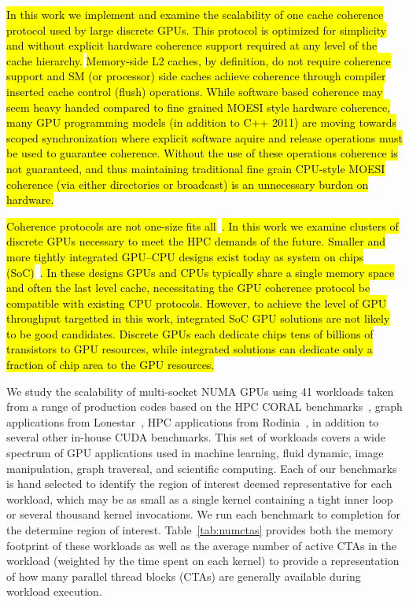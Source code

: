 \hl{In this work we implement and examine the scalability of one cache coherence 
protocol used by large discrete GPUs. This protocol is optimized for simplicity %
and without explicit hardware coherence support required at any level of the cache hierarchy.}  
\hl{Memory-side L2 caches, by definition, do not require 
coherence support and SM (or processor) side caches achieve coherence through 
compiler inserted cache control (flush) operations.  While software based 
coherence may seem heavy handed compared to fine grained MOESI style hardware 
coherence, many GPU programming models (in addition to C++ 2011) are moving 
towards scoped synchronization where explicit software aquire and release 
operations must be used to guarantee coherence.  Without the use of these 
operations coherence is not guaranteed, and thus maintaining traditional fine 
grain CPU-style MOESI coherence (via either directories or broadcast) is an 
unnecessary burdon on hardware.}

\hl{Coherence protocols are not one-size fits all}~\cite{agarwal2016selective,sinclair2015efficient,Power2013}\hl{.  
In this work we examine clusters 
of discrete GPUs necessary to meet the HPC demands of the future.  Smaller and 
more tightly integrated GPU--CPU designs exist today as system on chips (SoC)}~\cite{AMDCARRIZO,INTELSKYLAKEINTEGRATED}\hl{.  
In these designs GPUs and CPUs typically share a single memory space and often 
the last level cache, necessitating the GPU coherence protocol be compatible 
with existing CPU protocols. However, to achieve the level of GPU throughput 
targetted in this work, integrated SoC GPU solutions are not likely to be good 
candidates.  Discrete GPUs each dedicate chips tens of billions of transistors 
to GPU resources, while integrated solutions can dedicate only a fraction of 
chip area to the GPU resources.}

We study the scalability of multi-socket NUMA GPUs using 41 workloads 
taken from a range of 
production codes based on the HPC CORAL benchmarks~\cite{coral}, graph 
applications from Lonestar~\cite{lonestar}, HPC applications from 
Rodinia~\cite{Che2009}, in addition to several other in-house CUDA benchmarks. 
This set of workloads covers a wide spectrum of GPU applications used in 
machine learning, fluid dynamic, image manipulation, graph traversal, and
scientific computing.  Each of our benchmarks is hand selected to identify
the region of interest deemed representative for each workload, which may
be as small as a single kernel containing a tight inner loop or several thousand
kernel invocations.  We run each benchmark to completion for the determine
region of interest. Table~\ref{tab:numctas} provides both the memory footprint
of these workloads as well as the average number of active CTAs in the workload
(weighted by the time spent on each kernel) to provide a representation of 
how many parallel thread blocks (CTAs) are generally available
during workload execution.

